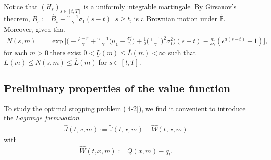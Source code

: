 \documentclass[a4paper,11pt]{amsart}
\numberwithin{equation}{section}
\newcommand{\blue}[1]{{\color{black}#1}}
\begin{document}
{Notice that $(H_s)_{s\in[t,T]}$ is a uniformly integrable martingale. By Girsanov's theorem, {$\widetilde B_s:=\widehat B_s-\frac{\gamma-1}{\gamma}\sigma_1(s-t)$, $s\geq t$, is a Brownian motion under $\mathbb{\widetilde P}$.} {Moreover, given that
\begin{align*}
N(s,m)&=\exp\bigg[\bigg(-\frac{\rho-r}{\gamma}+\frac{\gamma-1}{\gamma}\bigg(\mu_1-\frac{\sigma_1^2}{2}\bigg)+\frac{1}{2}\bigg(\frac{\gamma-1}{\gamma}\bigg)^2\sigma_1^2\bigg)(s-t)-\frac{m}{a\gamma}(e^{a(s-t)}-1)\bigg],
\end{align*}
for each $m>0$ there exist $0<\underline L(m)\leq\overline L(m)<\infty$ such that $\underline L(m)\leq N(s,m)\leq\overline L(m)$ for $s\in[t,T]$.}



 

\subsection{Preliminary properties of the value function}
To study the optimal stopping problem (\ref{4-2}), we find it convenient to introduce the \blue{\textit{Lagrange formulation}}
\begin{align}\label{4-3}
\widehat{J}(t,x,m):=\widetilde{J}(t,x,m)-\widehat{W}(t,x,m)
\end{align}
with
\begin{align}\label{4-4}
\widehat{W}(t,x,m):=Q(x,m)-q_t.
\end{align}

}
\end{document}
